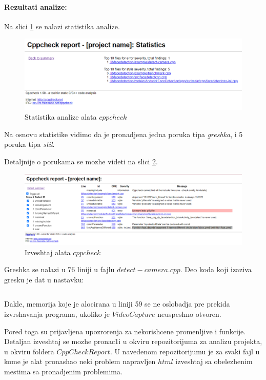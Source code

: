 \documentclass{article}
\begin{document}
\paragraph{Rezultati analize:}
Na slici \ref{stats:cppcheck} se nalazi statistika analize.

\begin{figure}[H]
    \centering
    \includegraphics[width=12cm]{img/cppCheckStats.png}
    \caption{Statistika analize alata $cppcheck$}
    \label{stats:cppcheck}
\end{figure}
Na osnovu statistike vidimo da je pronadjena jedna poruka tipa \textit{greshka}, i 5 poruka tipa \textit{stil}.

Detaljnije o porukama se mozhe videti na slici \ref{html:cppcheck}.
\begin{figure}[H]
    \centering
    \includegraphics[width=12cm]{img/cppChechHtmlReport.png}
    \caption{Izveshtaj alata $cppcheck$}
    \label{html:cppcheck}
\end{figure}

Greshka se nalazi u 76 liniji u fajlu $detect-camera.cpp$. Deo koda koji izaziva gresku je dat u nastavku:
\selectfont

\inputminted[frame=lines,
framesep=2mm,
baselinestretch=1.2,
bgcolor=LightGray,
fontsize=\footnotesize,
firstline=55,
lastline=77,
linenos
]{cpp}{detect-camera.cpp}

\selectfont
Dakle, memorija koje je alocirana u liniji 59 se ne oslobadja pre prekida izvrshavanja programa, ukoliko je $VideoCapture$ neuspeshno otvoren.

Pored toga su prijavljena upozrorenja za nekorishcene promenljive i funkcije. Detaljan izveshtaj se mozhe pronac1i u okviru repozitorijuma za analizu projekta, u okviru foldera $CppCheckReport.$ U navedenom repozitorijumu je za svaki fajl u kome je alat pronashao neki problem napravljen $html$ izveshtaj sa obelezhenim mestima sa pronadjenim problemima.
\end{document}
